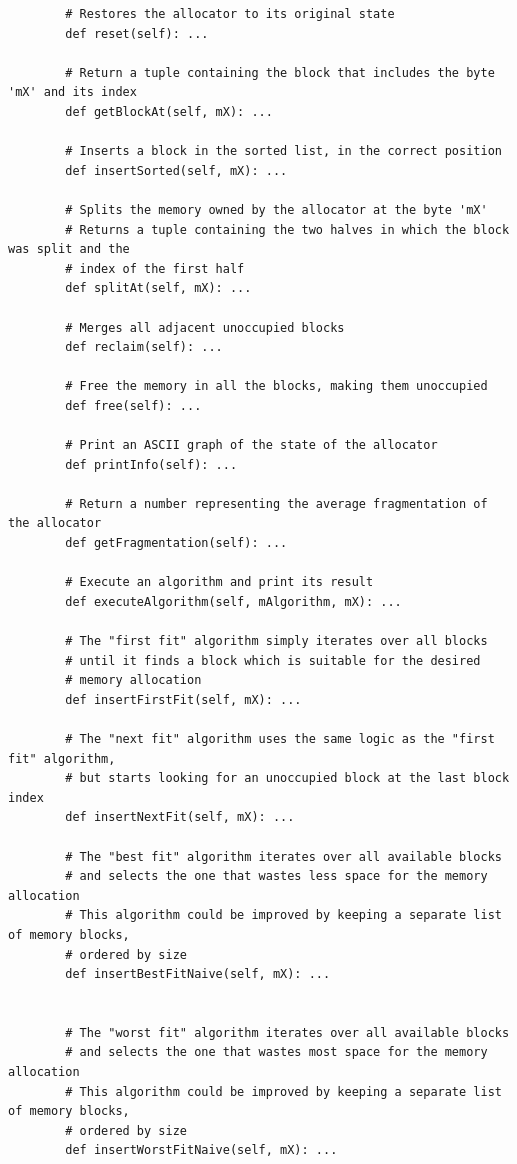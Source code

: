 \documentclass[12pt]{report}
\begin{document}
\begin{itemize}
\begin{verbatim}
        # Restores the allocator to its original state
        def reset(self): ...

        # Return a tuple containing the block that includes the byte 'mX' and its index
        def getBlockAt(self, mX): ...

        # Inserts a block in the sorted list, in the correct position
        def insertSorted(self, mX): ...

        # Splits the memory owned by the allocator at the byte 'mX'
        # Returns a tuple containing the two halves in which the block was split and the
        # index of the first half
        def splitAt(self, mX): ...

        # Merges all adjacent unoccupied blocks
        def reclaim(self): ...

        # Free the memory in all the blocks, making them unoccupied
        def free(self): ...

        # Print an ASCII graph of the state of the allocator
        def printInfo(self): ...

        # Return a number representing the average fragmentation of the allocator
        def getFragmentation(self): ...

        # Execute an algorithm and print its result
        def executeAlgorithm(self, mAlgorithm, mX): ...

        # The "first fit" algorithm simply iterates over all blocks
        # until it finds a block which is suitable for the desired
        # memory allocation
        def insertFirstFit(self, mX): ...

        # The "next fit" algorithm uses the same logic as the "first fit" algorithm,
        # but starts looking for an unoccupied block at the last block index
        def insertNextFit(self, mX): ...

        # The "best fit" algorithm iterates over all available blocks
        # and selects the one that wastes less space for the memory allocation
        # This algorithm could be improved by keeping a separate list of memory blocks,
        # ordered by size
        def insertBestFitNaive(self, mX): ...


        # The "worst fit" algorithm iterates over all available blocks
        # and selects the one that wastes most space for the memory allocation
        # This algorithm could be improved by keeping a separate list of memory blocks,
        # ordered by size
        def insertWorstFitNaive(self, mX): ...


\end{verbatim}
\end{itemize}
\end{document}
